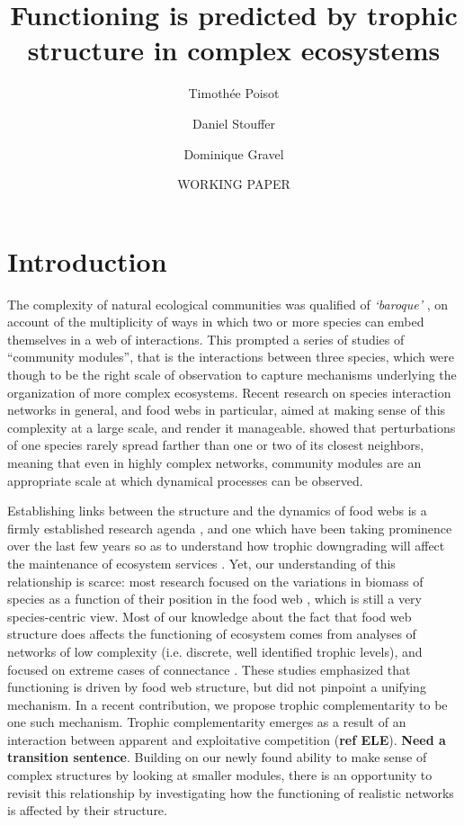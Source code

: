 \documentclass[12pt]{article}
\title{Functioning is predicted by trophic structure in complex ecosystems}
\author{Timoth\'ee Poisot\and Daniel Stouffer\and Dominique Gravel}
\date{WORKING PAPER}
\begin{document}
\maketitle\doublespacing

\section{Introduction}

The complexity of natural ecological communities was qualified of
\emph{`baroque'} \parencite{holt_community_1997}, on account of the
multiplicity of ways in which two or more species can embed themselves in a
web of interactions. This prompted a series of studies of ``community
modules'', that is the interactions between three species, which were though
to be the right scale of observation to capture mechanisms underlying the
organization of more complex ecosystems. Recent research on species
interaction networks in general, and food webs in particular, aimed at making
sense of this complexity at a large scale, and render it manageable.
\textcite{berlow_simple_2009} showed that perturbations of one species rarely
spread farther than one or two of its closest neighbors, meaning that even in
highly complex networks, community modules are an appropriate scale at which
dynamical processes can be observed.


Establishing links between the structure and the dynamics of food webs is a
firmly established research agenda \parencite{Pascual2006}, and one which have
been taking prominence over the last few years so as to understand how trophic
downgrading will affect the maintenance of ecosystem services
\parencite{Estes2011}. Yet, our understanding of this relationship is scarce:
most research focused on the variations in biomass of species as a function of
their position in the food web \parencite{Williams2007,Berlow2009}, which is
still a very species-centric view. Most of our knowledge about the fact that
food web structure does affects the functioning of ecosystem comes from
analyses of networks of low complexity (i.e. discrete, well identified trophic
levels), and focused on extreme cases of connectance
\parencite[e.g.][]{Thebault2003,Thebault2007}. These studies emphasized that
functioning is driven by food web structure, but did not pinpoint a unifying
mechanism. In a recent contribution, we propose trophic complementarity to be
one such mechanism. Trophic complementarity emerges as a result of an
interaction between apparent and exploitative competition (\textbf{ref ELE}).
\textbf{Need a transition sentence}. Building on our newly found ability to
make sense of complex structures by looking at smaller modules, there is an
opportunity to revisit this relationship by investigating how the functioning
of realistic networks is affected by their structure.
\end{document}
